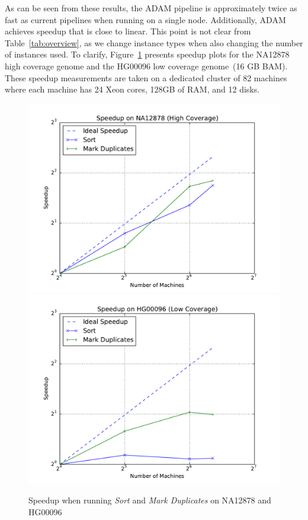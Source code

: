 \documentclass{bioinfo}
\begin{document}
As can be seen from these results, the ADAM pipeline is approximately twice as fast as current pipelines when running on a single node. Additionally, ADAM achieves
speedup that is close to linear. This point is not clear from Table~\ref{tab:overview}, as we change instance types when also changing the number of instances used. To clarify,
Figure~\ref{fig:speedup} presents speedup plots for the NA12878 high coverage genome and the HG00096 low coverage genome~(16 GB BAM). These speedup
measurements are taken on a dedicated cluster of 82 machines where each machine has 24 Xeon cores, 128GB of RAM, and 12 disks.

\begin{figure}[h]
\begin{center}
\includegraphics[width=0.99\linewidth]{graphs/speedup_na12878.pdf}
\includegraphics[width=0.99\linewidth]{graphs/speedup_hg00096.pdf}
\end{center}
\caption{Speedup when running \textit{Sort} and \textit{Mark Duplicates} on NA12878 and HG00096}
\label{fig:speedup}
\end{figure}
\end{document}
